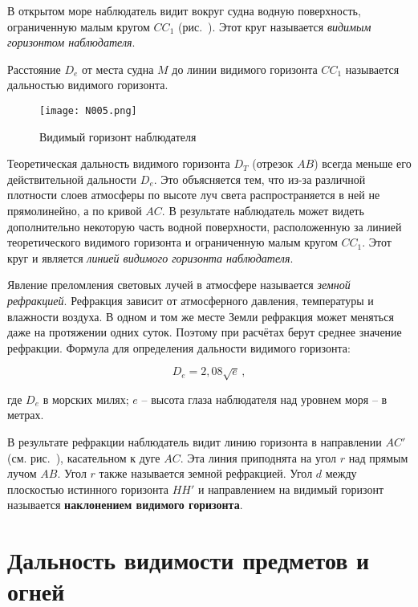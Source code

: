 В открытом море наблюдатель видит вокруг судна водную поверхность,
ограниченную малым кругом $CC_1$ (рис.~). Этот круг называется
\textit{видимым горизонтом наблюдателя}.

Расстояние $D_e$ от места судна $M$ до линии видимого горизонта $CC_1$
называется дальностью видимого горизонта.

\begin{wrapfigure}{O}{0.4\textwidth}
  \centering{}
  \texttt{[image: N005.png]}
  \caption{Видимый горизонт наблюдателя}
  \label{fig:N5}
\end{wrapfigure}

Теоретическая дальность видимого горизонта $D_T$ (отрезок $AB$) всегда
меньше его действительной дальности $D_e$. Это объясняется тем, что
из-за различной плотности слоев атмосферы по высоте луч света
распространяется в ней не прямолинейно, а по кривой $AC$. В результате
наблюдатель может видеть дополнительно некоторую часть водной
поверхности, расположенную за линией теоретического видимого горизонта
и ограниченную малым кругом $CC_1$. Этот круг и является \textit{линией
видимого горизонта наблюдателя}.

Явление преломления световых лучей в атмосфере называется
\textit{земной рефракцией}. Рефракция зависит
от атмосферного давления, температуры и влажности воздуха. В одном и
том же месте Земли рефракция может меняться даже на протяжении одних
суток. Поэтому при расчётах берут среднее значение рефракции. Формула
для определения дальности видимого горизонта:

\begin{equation}
  D_e = 2,08 \sqrt{e} \, ,
\end{equation}

где $D_e$ в морских милях; $e$ \--- высота глаза наблюдателя над
уровнем моря \--- в метрах.

В результате рефракции наблюдатель видит линию горизонта в направлении
$AC'$ (см. рис.~), касательном к дуге $AC$. Эта линия
приподнята на угол $r$ над прямым лучом $AB$. Угол $r$ также
называется земной рефракцией. Угол $d$ между плоскостью истинного
горизонта $HH'$ и направлением на видимый горизонт называется
\textbf{наклонением видимого горизонта}.

\section{Дальность видимости предметов и огней}

